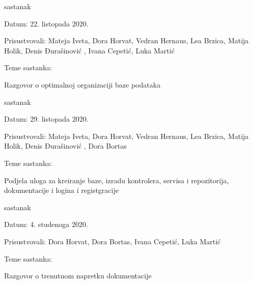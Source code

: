 \begin{packed_enum}
			
				\item  sastanak
				
				\item[] \begin{packed_item}
					\item Datum: 22. listopada 2020.
					\item Prisustvovali: Mateja Iveta, Dora Horvat, Vedran Hernaus, Lea Brzica, Matija Holik, Denis Đurašinović , Ivana Cepetić, Luka Martić
					\item Teme sastanka:
					\begin{packed_item}
						\item Razgovor o optimalnoj organizaciji baze podataka
					\end{packed_item}
				\end{packed_item}
				\item  sastanak
			
			\item[] \begin{packed_item}
				\item Datum: 29. listopada 2020.
				\item Prisustvovali: Mateja Iveta, Dora Horvat, Vedran Hernaus, Lea Brzica, Matija Holik, Denis Đurašinović , Dora Bortas
				\item Teme sastanka:
				\begin{packed_item}
					\item Podjela uloga za kreiranje baze, izradu kontrolera, servisa i repozitorija, dokumentacije i logina i registgracije
				\end{packed_item}
			\end{packed_item}
		 \item sastanak
		\item[] \begin{packed_item}
			\item Datum: 4. studenoga 2020.
			\item Prisustvovali:  Dora Horvat, Dora Bortas, Ivana Cepetić, Luka Martić
			\item Teme sastanka:
			\begin{packed_item}
				\item Razgovor o trenutnom napretku dokumentacije
				

\end{packed_item}
\end{packed_item}
\end{packed_enum}
